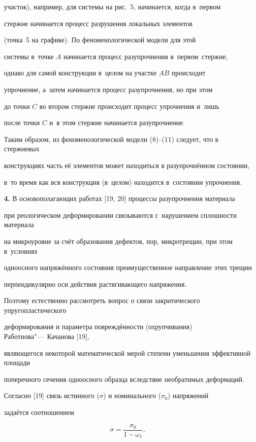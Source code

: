 участок), например, для системы на рис.~5, начинается, когда в~первом 

стержне начинается процесс разрушения локальных элементов

(точка~5 на графике). По феноменологической модели для этой

системы в~точке $A$ начинается процесс разупрочнения в~первом~стержне,

однако для самой конструкции в~целом на участке $AB$ происходит

упрочнение, а~затем начинается процесс разупрочнения, но при этом

до точки $C$ во втором стержне происходит процесс упрочнения и~лишь

после точки $C$ и~в этом стержне начинается разупрочнение.



Таким образом, из феноменологической модели (8)--(11) следует, что в стержневых

конструкциях часть её элементов может находиться в разупрочнённом состоянии, 

в~то время как вся конструкция (в~целом) находится в~состоянии упрочнения. 



{\bf 4.} В основополагающих работах [19, 20] процессы разупрочнения материала 

при реологическом деформировании связываются с~нарушением сплошности материала 

на микроуровне за счёт образования дефектов, пор, микротрещин, при этом в~условиях 

одноосного напряжённого состояния преимущественное направление этих трещин 

перпендикулярно оси действия растягивающего напряжения.

Поэтому естественно рассмотреть вопрос о связи закритического упругопластического

деформирования и параметра повреждённости (охрупчивания) Работнова"---~Качанова [19],

являющегося некоторой математической мерой степени уменьшения эффективной площади 

поперечного сечения одноосного образца вследствие необратимых деформаций.



Согласно [19] связь истинного ($\sigma$) и номинального ($\sigma_0$) напряжений 

задаётся соотношением

\begin{equation}

\sigma = \frac{\sigma_0}{1-\omega_1},

\end{equation}

